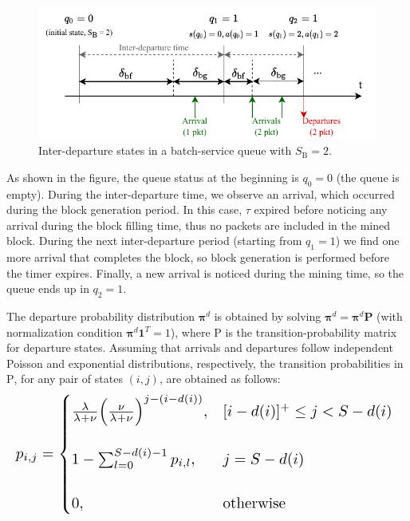 \documentclass[lettersize,journal]{IEEEtran}
\begin{document}
\begin{figure}[ht!]
	\centering
	\includegraphics[width=\columnwidth]{img/queue_arrivals_example.pdf}
	\caption{Inter-departure states in a batch-service queue with $S_\text{B}=2$.}
	\label{fig:queue_arrivals_example}
\end{figure}

As shown in the figure, the queue status at the beginning is $q_0 = 0$ (the queue is empty). During the inter-departure time, we observe an arrival, which occurred during the block generation period. In this case, $\tau$ expired before noticing any arrival during the block filling time, thus no packets are included in the mined block. During the next inter-departure period (starting from $q_1 = 1$) we find one more arrival that completes the block, so block generation is performed before the timer expires. Finally, a new arrival is noticed during the mining time, so the queue ends up in $q_2 = 1$.

The departure probability distribution $\boldsymbol{\pi}^d$ is obtained by solving $\boldsymbol{\pi}^d = \boldsymbol{\pi}^d \boldsymbol{\text{P}}$ (with normalization condition $\boldsymbol{\pi}^d \boldsymbol{1}^T = 1$), where $\text{P}$ is the transition-probability matrix for departure states. Assuming that arrivals and departures follow independent Poisson and exponential distributions, respectively, the transition probabilities in $\text{P}$, for any pair of states $(i,j)$, are obtained as follows:
\begin{equation}
\resizebox{\linewidth}{!}{%
	$p_{i,j} = \begin{cases}
	\frac{\lambda}{\lambda + \nu} \Big(\frac{\nu}{\lambda + \nu}\Big)^{j-(i-d(i))}, & [i - d(i)]^+ \leq j < S - d(i)
	\\
	\\
	1-\sum^{S-d(i)-1}_{l=0} p_{i,l}, & j = S - d(i)
	\\
	\\
	0, & \text{otherwise}
	\end{cases}$
}
\label{eq:12}
\end{equation}
\end{document}
